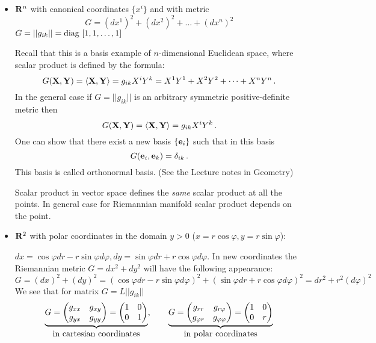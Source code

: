 \documentclass[12pt]{article}
\theoremstyle{theorem}
\numberwithin{equation}{section}
\begin{document}
   \begin{itemize}
\item


   ${\bf R}^n$ with canonical coordinates $\{x^i\}$ and with metric
               $$
           G=(dx^1)^2+(dx^2)^2+\dots+(dx^n)^2
               $$
           $G=||g_{ik}||=\rm diag\,\, [1,1,\dots,1]$

Recall that this is a basis example of $n$-dimensional Euclidean space, where scalar product
is defined by the formula:
              $$
     G({\bf X},{\bf Y})=\langle{\bf X},{\bf Y}\rangle=g_{ik}X^iY^k=X^1Y^1+X^2Y^2+\dots+X^nY^n\,.
              $$
In the general case if $G=||g_{ik}||$ is an arbitrary symmetric positive-definite metric then
                $$
            G({\bf X},{\bf Y})=\langle{\bf X},{\bf Y}\rangle=g_{ik}X^iY^k\,.
                $$
One can show that there exist a new basis $\{{\bf e}_i\}$ such that in this basis
              $$
              G({\bf e}_i,{\bf e}_k)=\delta_{ik}\,.
               $$
This basis is called orthonormal basis. (See the Lecture notes in Geometry)

Scalar product in vector space defines the {\it same} scalar product at all the points. In general case
for Riemannian manifold scalar product depends on the point.


\item  ${\bf R}^2$ with polar coordinates in the domain $y>0$ ($x=r\cos\varphi, y=r\sin\varphi$):

   $dx=\cos\varphi dr-r\sin\varphi d\varphi, dy=\sin\varphi dr+r\cos\varphi d\varphi$.
  In new coordinates the Riemannian metric $G=dx^2+dy^2$ will have the following appearance:
             $$
        G=(dx)^2+(dy)^2=(\cos\varphi dr-r\sin\varphi d\varphi)^2+(\sin\varphi dr+r\cos\varphi d\varphi)^2=
         dr^2+r^2(d\varphi)^2
            $$
   We see that for matrix    $G=L||g_{ik}||$
             \begin{equation*}
                 \underbrace{G=
           \begin{pmatrix}        g_{xx} &g_{xy}\cr  g_{yx} &g_{yy} \end{pmatrix}=
      \begin{pmatrix}    1 &0\cr  0 &1\cr  \end{pmatrix}}_{\hbox{in cartesian coordinates}},\qquad
                 \underbrace
                 {G=
      \begin{pmatrix}g_{rr} &g_{r\varphi}\cr g_{\varphi r} &g_{\varphi\varphi}\end{pmatrix}=
      \begin{pmatrix}1 &0\cr 0 &r\end{pmatrix}}_ {\hbox{in polar coordinates}}
             \end{equation*}




\end{itemize}
\end{document}
